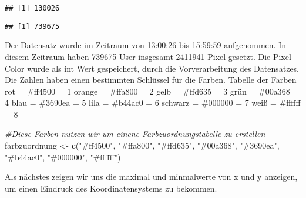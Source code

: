 \documentclass[
]{article}
\newenvironment{Shaded}{\begin{snugshade}}{\end{snugshade}}
\newcommand{\CommentTok}[1]{\textcolor[rgb]{0.56,0.35,0.01}{\textit{#1}}}
\newcommand{\FunctionTok}[1]{\textcolor[rgb]{0.13,0.29,0.53}{\textbf{#1}}}
\newcommand{\NormalTok}[1]{#1}
\newcommand{\OtherTok}[1]{\textcolor[rgb]{0.56,0.35,0.01}{#1}}
\newcommand{\SpecialCharTok}[1]{\textcolor[rgb]{0.81,0.36,0.00}{\textbf{#1}}}
\newcommand{\StringTok}[1]{\textcolor[rgb]{0.31,0.60,0.02}{#1}}
\begin{document}
\begin{verbatim}
## [1] 130026
\end{verbatim}

\begin{Shaded}
\end{Shaded}

\begin{verbatim}
## [1] 739675
\end{verbatim}

Der Datensatz wurde im Zeitraum von 13:00:26 bis 15:59:59 aufgenommen.
In diesem Zeitraum haben 739675 User insgesamt 2411941 Pixel gesetzt.
Die Pixel Color wurde als int Wert gespeichert, durch die
Vorverarbeitung des Datensatzes. Die Zahlen haben einen bestimmten
Schlüssel für die Farben. Tabelle der Farben rot = \#ff4500 = 1 orange =
\#ffa800 = 2 gelb = \#ffd635 = 3 grün = \#00a368 = 4 blau = \#3690ea = 5
lila = \#b44ac0 = 6 schwarz = \#000000 = 7 weiß = \#ffffff = 8

\begin{Shaded}
\begin{Highlighting}[]
\CommentTok{\#Diese Farben nutzen wir um einene Farbzuordnungstabelle zu erstellen}
\NormalTok{farbzuordnung }\OtherTok{\textless{}{-}} \FunctionTok{c}\NormalTok{(}\StringTok{"\#ff4500"}\NormalTok{, }\StringTok{"\#ffa800"}\NormalTok{, }\StringTok{"\#ffd635"}\NormalTok{, }\StringTok{"\#00a368"}\NormalTok{, }\StringTok{"\#3690ea"}\NormalTok{, }\StringTok{"\#b44ac0"}\NormalTok{, }
\StringTok{"\#000000"}\NormalTok{, }\StringTok{"\#ffffff"}\NormalTok{)}
\end{Highlighting}
\end{Shaded}

Als nächstes zeigen wir uns die maximal und minmalwerte von x und y
anzeigen, um einen Eindruck des Koordinatensystems zu bekommen.

\begin{Shaded}
\end{Shaded}
\end{document}
